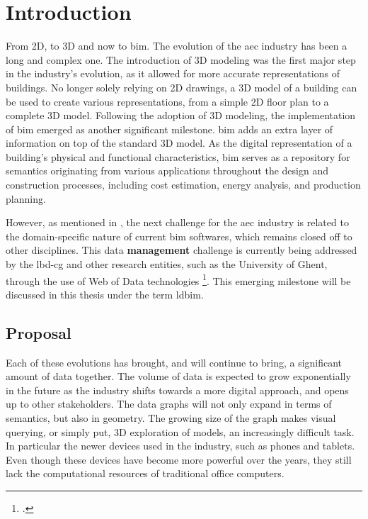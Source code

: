 \chapter{Introduction} \label{ch:introduction}
From 2D, to 3D and now to \acs{bim}. The evolution of the \ac{aec} industry has been a long and complex one. The introduction of 3D modeling was the first major step in the industry's evolution, as it allowed for more accurate representations of buildings. No longer solely relying on 2D drawings, a 3D model of a building can be used to create various representations, from a simple 2D floor plan to a complete 3D model. Following the adoption of 3D modeling, the implementation of \ac{bim} emerged as another significant milestone. \ac{bim} adds an extra layer of information on top of the standard 3D model. As the digital representation of a building's physical and functional characteristics, \ac{bim} serves as a repository for semantics originating from various applications throughout the design and construction processes, including cost estimation, energy analysis, and production planning.

\label{sec:intro}
However, as mentioned in \cite{Werbrouck2018}, the next challenge for the \ac{aec} industry is related to the domain-specific nature of current \ac{bim} softwares, which remains closed off to other disciplines. This data \textbf{management} challenge is currently being addressed by the \ac{lbd-cg} and other research entities, such as the University of Ghent, through the use of Web of Data technologies \footcite{ldbimGroup}. This emerging milestone will be discussed in this thesis under the term \ac{ldbim}.

\section{Proposal} \label{sec:proposal}
Each of these evolutions has brought, and will continue to bring, a significant amount of data together. The volume of data is expected to grow exponentially in the future as the industry shifts towards a more digital approach, and opens up to other stakeholders. The data graphs will not only expand in terms of semantics, but also in geometry. The growing size of the graph makes visual querying, or simply put, 3D exploration of models, an increasingly difficult task. In particular the newer devices used in the industry, such as phones and tablets. Even though these devices have become more powerful over the years, they still lack the computational resources of traditional office computers.

